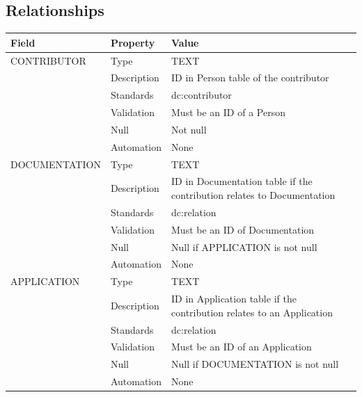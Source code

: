 \subsection{Relationships}\label{relationships-7}

\begin{longtable}[]{@{}
  >{\raggedright\arraybackslash}p{}
  >{\raggedright\arraybackslash}p{}
  >{\raggedright\arraybackslash}p{}@{}}
\toprule\noalign{}
\begin{minipage}[b]{\linewidth}\raggedright
Field
\end{minipage} & \begin{minipage}[b]{\linewidth}\raggedright
Property
\end{minipage} & \begin{minipage}[b]{\linewidth}\raggedright
Value
\end{minipage} \\
\midrule\noalign{}
\endhead
\bottomrule\noalign{}
\endlastfoot
CONTRIBUTOR & Type & TEXT \\
& Description & ID in Person table of the contributor \\
& Standards & dc:contributor \\
& Validation & Must be an ID of a Person \\
& Null & Not null \\
& Automation & None \\
DOCUMENTATION & Type & TEXT \\
& Description & ID in Documentation table if the contribution relates to
Documentation \\
& Standards & dc:relation \\
& Validation & Must be an ID of Documentation \\
& Null & Null if APPLICATION is not null \\
& Automation & None \\
APPLICATION & Type & TEXT \\
& Description & ID in Application table if the contribution relates to
an Application \\
& Standards & dc:relation \\
& Validation & Must be an ID of an Application \\
& Null & Null if DOCUMENTATION is not null \\
& Automation & None \\
\end{longtable}

